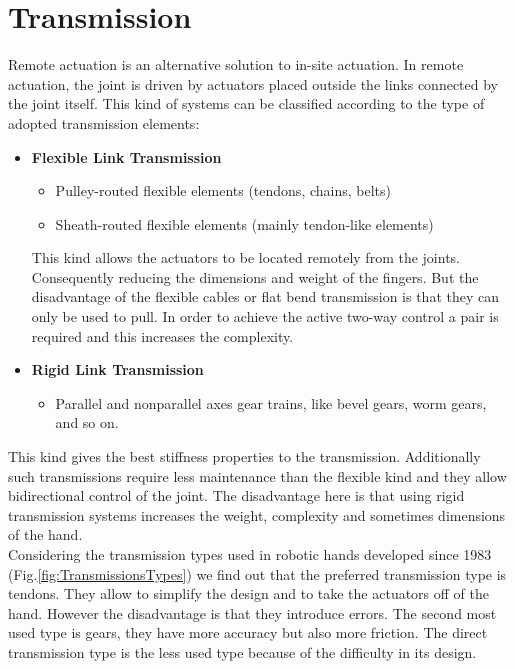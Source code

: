 \documentclass[a4paper, 10pt, conference]{ieeeconf}      %
\begin{document}
\section{\textbf{Transmission}}
Remote actuation is an alternative solution to in-site actuation. In remote actuation, the joint is driven by actuators placed outside the links connected by the joint itself. This kind of systems can be classified according to the type of adopted transmission elements:\\
\begin{itemize}
\item \textbf{Flexible Link Transmission}
	\begin{itemize}
		\item Pulley-routed flexible elements (tendons, chains, belts)
		\item Sheath-routed flexible elements (mainly tendon-like elements)\\
	\end{itemize}
This kind allows the actuators to be located remotely from the joints. Consequently reducing the dimensions and weight of the fingers. But the disadvantage of the flexible cables or flat bend transmission is that they can only be used to pull. In order to achieve the active two-way control a pair is required and this increases the complexity.\\ 
\item \textbf{Rigid Link Transmission}
	\begin{itemize}
		\item Parallel and nonparallel axes gear trains, like bevel gears, worm gears, and so on.\\
	\end{itemize}
\end{itemize}
This kind gives the best stiffness properties to the transmission. Additionally such transmissions require less maintenance than the flexible kind and they allow bidirectional control of the joint. The disadvantage here is that using rigid transmission systems increases the weight, complexity and sometimes dimensions of the hand.\\
Considering the transmission types used in robotic hands developed since 1983 (Fig.\ref{fig:TransmissionsTypes}) we find out that the preferred transmission type is tendons. They allow to simplify the design and to take the actuators off of the hand. However the disadvantage is that they introduce errors. The second most used type is gears, they have more accuracy but also more friction. The direct transmission type is the less used type because of the difficulty in its design.\\
\end{document}
